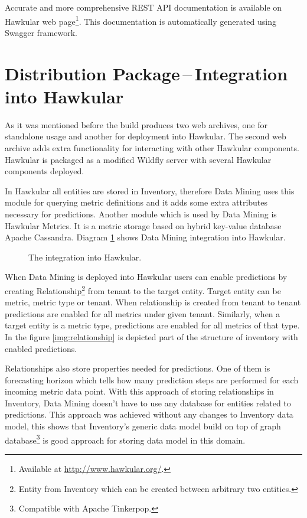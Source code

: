     Accurate and more comprehensive REST API documentation is available on Hawkular web page\footnote{Available at
    \url{http://www.hawkular.org/}.}. This documentation is automatically generated using Swagger framework.

    \section{Distribution Package\,--\,Integration into Hawkular} \label{dist}
    As it was mentioned before the build produces two web archives, one for standalone usage and another for
    deployment into Hawkular. The second web archive adds extra functionality for interacting with other Hawkular
    components. Hawkular is packaged as a modified Wildfly server with several Hawkular components deployed.

    In Hawkular all entities are stored in Inventory, therefore Data Mining uses this module
    for querying metric definitions and it adds some extra attributes necessary for predictions. Another module
    which is used by Data Mining is Hawkular Metrics. It is a metric storage based on hybrid key-value
    database Apache Cassandra. Diagram \ref{img:hawkular-interaction} shows Data Mining integration into Hawkular.

    \begin{figure}[H]
        \begin{center}
            \caption{The integration into Hawkular.}
            \label{img:hawkular-interaction}
        \end{center}
    \end{figure}

    When Data Mining is deployed into Hawkular users can enable predictions by creating Relationship\footnote{Entity
    from Inventory which can be created between arbitrary two entities.} from tenant to the target entity. Target
    entity can be metric, metric type or tenant. When relationship is created from tenant to tenant predictions are
    enabled for all metrics under given tenant. Similarly, when a target entity is a metric type, predictions are
    enabled for all metrics of that type. In the figure \ref{img:relationship} is depicted part of the structure of
    inventory with enabled predictions.

    Relationships also store properties needed for predictions. One of them is forecasting horizon which tells how
    many prediction steps are performed for each incoming metric data point. With this approach of storing
    relationships in Inventory, Data Mining doesn't have to use any database for entities related to predictions.
    This approach was achieved without any changes to Inventory data model, this shows that Inventory's generic data
    model build on top of graph database\footnote{Compatible with Apache Tinkerpop.} is good approach for storing data
    model in this domain.


